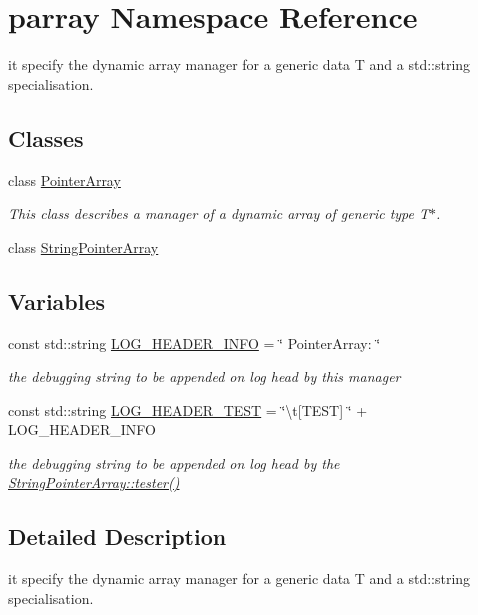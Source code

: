 \hypertarget{namespaceparray}{\section{parray Namespace Reference}
\label{namespaceparray}
}


it specify the dynamic array manager for a generic data T and a std\-::string specialisation.  


\subsection*{Classes}
\begin{DoxyCompactItemize}
\item 
class \hyperlink{classparray_1_1PointerArray}{Pointer\-Array}
\begin{DoxyCompactList}\small\item\em This class describes a manager of a dynamic array of generic type T$\ast$. \end{DoxyCompactList}\item 
class \hyperlink{classparray_1_1StringPointerArray}{String\-Pointer\-Array}
\end{DoxyCompactItemize}
\subsection*{Variables}
\begin{DoxyCompactItemize}
\item 
\hypertarget{namespaceparray_ae12e5e44ecdf5808872ebdc05476e93f}{const std\-::string \hyperlink{namespaceparray_ae12e5e44ecdf5808872ebdc05476e93f}{L\-O\-G\-\_\-\-H\-E\-A\-D\-E\-R\-\_\-\-I\-N\-F\-O} = \char`\"{} Pointer\-Array\-: \char`\"{}}\label{namespaceparray_ae12e5e44ecdf5808872ebdc05476e93f}

\begin{DoxyCompactList}\small\item\em the debugging string to be appended on log head by this manager \end{DoxyCompactList}\item 
\hypertarget{namespaceparray_ab57bc1fd35280f9304abbf9755598710}{const std\-::string \hyperlink{namespaceparray_ab57bc1fd35280f9304abbf9755598710}{L\-O\-G\-\_\-\-H\-E\-A\-D\-E\-R\-\_\-\-T\-E\-S\-T} = \char`\"{}\textbackslash{}t\mbox{[}T\-E\-S\-T\mbox{]} \char`\"{} + L\-O\-G\-\_\-\-H\-E\-A\-D\-E\-R\-\_\-\-I\-N\-F\-O}\label{namespaceparray_ab57bc1fd35280f9304abbf9755598710}

\begin{DoxyCompactList}\small\item\em the debugging string to be appended on log head by the \hyperlink{classparray_1_1StringPointerArray_abfac13570bec8c88311714d19ddea59b}{String\-Pointer\-Array\-::tester()} \end{DoxyCompactList}\end{DoxyCompactItemize}


\subsection{Detailed Description}
it specify the dynamic array manager for a generic data T and a std\-::string specialisation. 